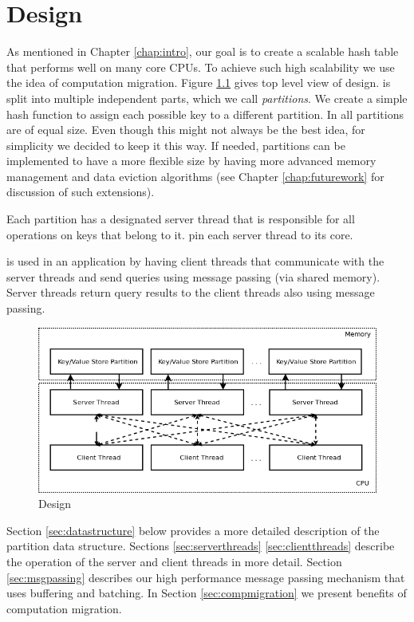 \chapter{\cphash{} Design}
\label{chap:mcstore}

As mentioned in Chapter \ref{chap:intro}, our goal is to create a scalable hash table 
that performs well on many core CPUs. To achieve such high scalability we use the idea of 
computation migration. Figure \ref{fig:mcstore} gives top level view of \cphash{} design. 
\cphash{} is split into multiple independent parts, which we call \textit{partitions}. We create a simple 
hash function to assign each possible key to a different partition. In \cphash{} all partitions are of equal size. Even though 
this might not always be the best idea, for simplicity we decided to keep it this way. 
If needed, partitions can be implemented to have a more flexible size by having more advanced 
memory management and data eviction algorithms (see Chapter \ref{chap:futurework} for discussion of such extensions).

Each partition has a designated server thread that is responsible for all operations 
on keys that belong to it. \cphash{} pin each server thread to its core.

\cphash{} is used in an application by having client threads that communicate with the server threads
and send queries using message passing (via shared memory). Server threads return query results
to the client threads also using message passing.  

\begin{figure}[!ht]
  \centering
  \includegraphics[width=0.8\linewidth]{figs/mcstore.png}
  \caption{\cphash{} Design}
  \label{fig:mcstore}
\end{figure}

  
Section \ref{sec:datastructure} below provides a more detailed description of the partition data structure. 
Sections \ref{sec:serverthreads} \ref{sec:clientthreads} describe the operation of the server and client threads in more detail. 
Section \ref{sec:msgpassing} describes our high performance message passing mechanism that uses buffering and batching. 
In Section \ref{sec:compmigration} we present benefits of computation migration. 

